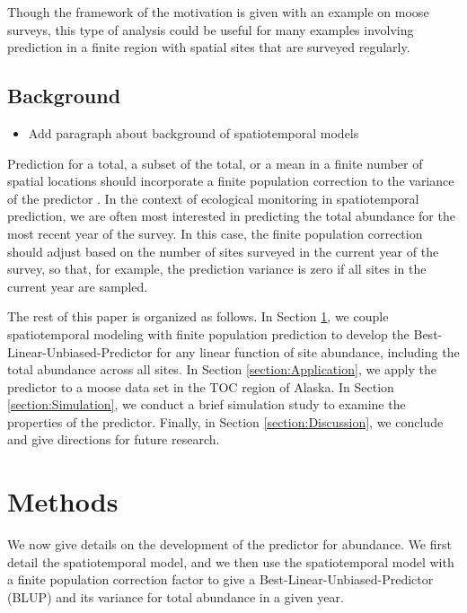 \documentclass[]{interact}
\theoremstyle{plain}%
\theoremstyle{definition}
\theoremstyle{remark}
\def\tightlist{}
\begin{document}
Though the framework of the motivation is given with an example on moose
surveys, this type of analysis could be useful for many examples
involving prediction in a finite region with spatial sites that are
surveyed regularly.

\subsection{Background}

\begin{itemize}
\tightlist
\item
  Add paragraph about background of spatiotemporal models
\end{itemize}

Prediction for a total, a subset of the total, or a mean in a finite
number of spatial locations should incorporate a finite population
correction to the variance of the predictor
\citep{ver2008spatial, higham2021adjusting}. In the context of
ecological monitoring in spatiotemporal prediction, we are often most
interested in predicting the total abundance for the most recent year of
the survey. In this case, the finite population correction should adjust
based on the number of sites surveyed in the current year of the survey,
so that, for example, the prediction variance is zero if all sites in
the current year are sampled.

The rest of this paper is organized as follows. In Section
\ref{section:Methods}, we couple spatiotemporal modeling with finite
population prediction to develop the Best-Linear-Unbiased-Predictor for
any linear function of site abundance, including the total abundance
across all sites. In Section \ref{section:Application}, we apply the
predictor to a moose data set in the TOC region of Alaska. In Section
\ref{section:Simulation}, we conduct a brief simulation study to examine
the properties of the predictor. Finally, in Section
\ref{section:Discussion}, we conclude and give directions for future
research.

\section{Methods} \label{section:Methods}

We now give details on the development of the predictor for abundance.
We first detail the spatiotemporal model, and we then use the
spatiotemporal model with a finite population correction factor to give
a Best-Linear-Unbiased-Predictor (BLUP) and its variance for total
abundance in a given year.
\end{document}
